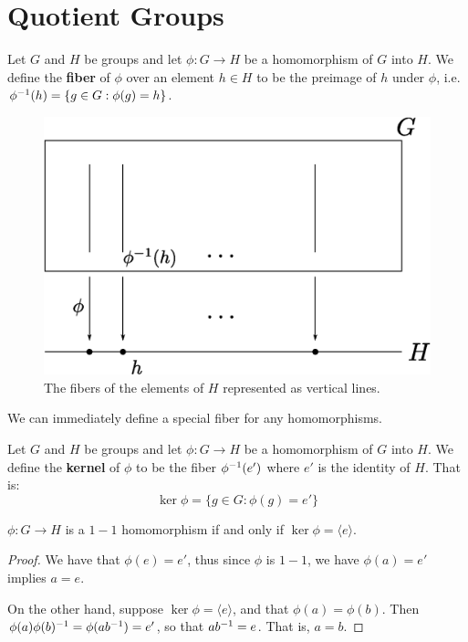 \section{Quotient Groups}
\label{section_3.1}

\begin{definition}
  Let $G$ and $H$ be groups and let $\phi:G \rightarrow H$ be a homomorphism
  of $G$ into  $H$. We define the \textbf{fiber} of $\phi$ over an element $h
  \in H$ to be the preimage of  $h$ under  $\phi$, i.e.  $\phi^{-1}(h)=\{g
  \in G : \phi(g)=h\}$.
\end{definition}

\begin{figure}[h]
  \centering
  \includegraphics[scale = 0.5]{parts/group_theory/figures/Chapter3/fibers.eps}
  \caption{The fibers of the elements of $H$ represented as vertical lines.}
  \label{figure_3.1}
\end{figure}

We can immediately define a special fiber for any homomorphisms.

\begin{definition}
  Let $G$ and  $H$ be groups and let  $\phi:G \rightarrow H$ be a homomorphism
  of $G$ into  $H$. We define the \textbf{kernel} of $\phi$ to be the fiber
  $\phi^{-1}(e')$ where $e'$ is the identity of  $H$. That is:
  \begin{equation}
    \ker{\phi}=\{g \in G : \phi(g)=e'\}
  \end{equation}
\end{definition}

\begin{lemma}\label{lemma_3.1.1}
  $\phi:G \rightarrow H$ is a $1-1$ homomorphism if and only if
  $\ker{\phi}=\langle e \rangle$.
\end{lemma}
\begin{proof}
  We have that $\phi(e)=e'$, thus since $\phi$ is $1-1$, we have $\phi(a)=e'$
  implies $a=e$.

  On the other hand, suppose $\ker{\phi}=\langle e \rangle$, and that
  $\phi(a)=\phi(b)$. Then $\phi(a)\phi(b)^{-1}=\phi(ab^{-1})=e'$, so that
  $ab^{-1}=e$. That is, $a=b$.
\end{proof}

